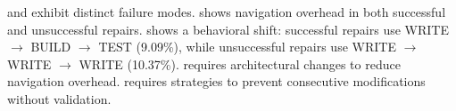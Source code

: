 \qwencode and \geminicli exhibit distinct failure modes. \qwencode shows navigation overhead in both successful and unsuccessful repairs. \geminicli shows a behavioral shift: successful repairs use WRITE $\rightarrow$ BUILD $\rightarrow$ TEST (9.09\%), while unsuccessful repairs use WRITE $\rightarrow$ WRITE $\rightarrow$ WRITE (10.37\%). \qwencode requires architectural changes to reduce navigation overhead. \geminicli requires strategies to prevent consecutive modifications without validation.
